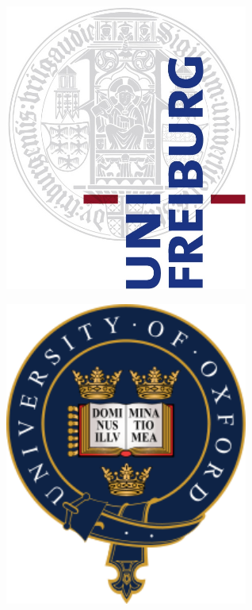 \documentclass[landscape,a0b,final,a4resizeable]{include/a0poster}
\begin{document}
\begin{poster}
\begin{center}
\begin{pcolumn}{0.99}
{\begin{minipage}[c]{\logowidth}
    \includegraphics[width=8cm,trim=0em 0em 0em 0em, clip]{badges/uni-freiburg}
\end{minipage}
%
\hspace{1cm}
% 
\begin{minipage}[c]{\logowidth}
    \includegraphics[width=8cm,trim=0em 0em 0em 0em, clip]{badges/oxford}
\end{minipage}

}
\end{pcolumn}
\end{center}


\end{poster}
\end{document}
